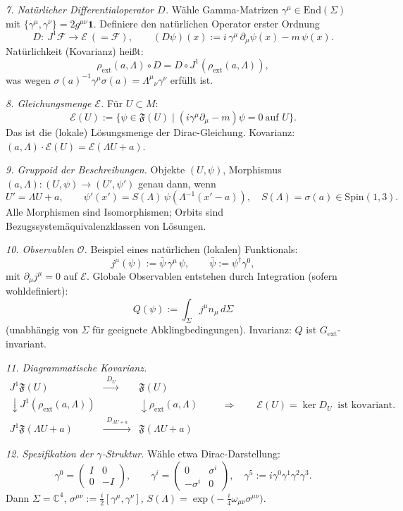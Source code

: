\documentclass[10pt, letterpaper]{article}
\newcommand{\C}{\mathbb{C}}
\newcommand{\End}{\mathrm{End}}
\newcommand{\Spin}{\mathrm{Spin}}
\begin{document}
\medskip
\emph{7. Natürlicher Differentialoperator \(D\).}
Wähle Gamma-Matrizen \(\gamma^\mu\in \End(\Sigma)\) mit
\(\{\gamma^\mu,\gamma^\nu\}=2g^{\mu\nu}\mathbf 1\).
Definiere den natürlichen Operator erster Ordnung
\[
D:\ J^1\mathcal F\to \mathcal E\ (=\mathcal F),\qquad
(D\psi)(x):= i\,\gamma^\mu\,\partial_\mu \psi(x)-m\,\psi(x).
\]
Natürlichkeit (Kovarianz) heißt:
\[
\rho_{\mathrm{ext}}(a,\Lambda)\circ D
= D\circ J^1(\rho_{\mathrm{ext}}(a,\Lambda)),
\]
was wegen \(\sigma(a)^{-1}\gamma^\mu\sigma(a)=\Lambda^\mu{}_\nu\gamma^\nu\) erfüllt ist.

\medskip
\emph{8. Gleichungsmenge \(\mathcal E\).}
Für \(U\subset M\):
\[
\mathcal E(U):=\{\psi\in\mathfrak F(U)\mid (i\gamma^\mu\partial_\mu-m)\psi=0\ \text{auf }U\}.
\]
Das ist die (lokale) Lösungsmenge der Dirac-Gleichung. Kovarianz:
\((a,\Lambda)\cdot \mathcal E(U)=\mathcal E(\Lambda U+a)\).

\medskip
\emph{9. Gruppoid der Beschreibungen.}
Objekte \((U,\psi)\), Morphismus \((a,\Lambda):(U,\psi)\to(U',\psi')\) genau dann, wenn
\[
U'=\Lambda U + a,\qquad
\psi'(x')=S(\Lambda)\,\psi(\Lambda^{-1}(x'-a)),\quad S(\Lambda)=\sigma(a)\in \Spin(1,3).
\]
Alle Morphismen sind Isomorphismen; Orbits sind Bezugssystemäquivalenzklassen von Lösungen.

\medskip
\emph{10. Observablen \(\mathcal O\).}
Beispiel eines natürlichen (lokalen) Funktionals:
\[
j^\mu(\psi):=\bar\psi\,\gamma^\mu\,\psi,\qquad \bar\psi:=\psi^\dagger\gamma^0,
\]
mit \(\partial_\mu j^\mu=0\) auf \(\mathcal E\).
Globale Observablen entstehen durch Integration (sofern wohldefiniert):
\[
Q(\psi):=\int_\Sigma j^\mu n_\mu\, d\Sigma
\]
(unabhängig von \(\Sigma\) für geeignete Abklingbedingungen). Invarianz: \(Q\) ist \(G_{\mathrm{ext}}\)-invariant.

\medskip
\emph{11. Diagrammatische Kovarianz.}
\[
\begin{array}{ccc}
J^1\mathfrak F(U) & \xrightarrow{\ \ D_U\ \ } & \mathfrak F(U)\\[0.3em]
\downarrow J^1(\rho_{\mathrm{ext}}(a,\Lambda)) & & \downarrow \rho_{\mathrm{ext}}(a,\Lambda)\\[0.3em]
J^1\mathfrak F(\Lambda U{+}a) & \xrightarrow{\ \ D_{\Lambda U{+}a}\ \ } & \mathfrak F(\Lambda U{+}a)
\end{array}
\qquad\Rightarrow\qquad
\mathcal E(U)=\ker D_U\ \text{ ist kovariant.}
\]

\medskip
\emph{12. Spezifikation der \(\gamma\)-Struktur.}
Wähle etwa Dirac-Darstellung:
\[
\gamma^0=\begin{pmatrix} I & 0\\ 0 & -I\end{pmatrix},\qquad
\gamma^i=\begin{pmatrix} 0 & \sigma^i\\ -\sigma^i & 0\end{pmatrix},\quad
\gamma^5:=i\gamma^0\gamma^1\gamma^2\gamma^3.
\]
Dann \(\Sigma=\C^4\), \(\sigma^{\mu\nu}:=\tfrac{i}{2}[\gamma^\mu,\gamma^\nu]\),
\(S(\Lambda)=\exp\!\big(-\tfrac{i}{4}\omega_{\mu\nu}\sigma^{\mu\nu}\big)\).
\end{document}
